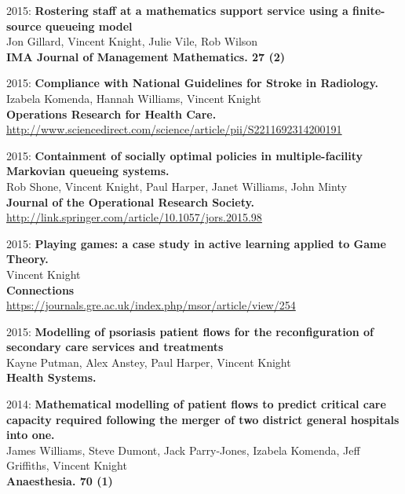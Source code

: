 \documentclass[10pt]{res} %
\begin{document}
\begin{resume}
\begin{etaremune}
\item
2015: \textbf{Rostering staff at a mathematics support service using a finite-source queueing model}\\
Jon Gillard, Vincent Knight, Julie Vile, Rob Wilson
\\
\textbf{IMA Journal of Management Mathematics. 27 (2)}
\\

\item
2015: \textbf{Compliance with National Guidelines for Stroke in Radiology.}\\
Izabela Komenda, Hannah Williams, Vincent Knight
\\
\textbf{Operations Research for Health Care.}
\\
\url{http://www.sciencedirect.com/science/article/pii/S2211692314200191}
\\

\item
2015: \textbf{Containment of socially optimal policies in multiple-facility Markovian queueing systems.}\\
Rob Shone, Vincent Knight, Paul Harper, Janet Williams, John Minty
\\
\textbf{Journal of the Operational Research Society.}
\\
\url{http://link.springer.com/article/10.1057/jors.2015.98}
\\

\item
2015: \textbf{Playing games: a case study in active learning applied to Game Theory.}\\
Vincent Knight
\\
\textbf{Connections}
\\
\url{https://journals.gre.ac.uk/index.php/msor/article/view/254}
\\

\item
2015: \textbf{Modelling of psoriasis patient flows for the reconfiguration of secondary care services and treatments}\\
Kayne Putman, Alex Anstey, Paul Harper, Vincent Knight
\\
\textbf{Health Systems.}
\\

\item
2014: \textbf{Mathematical modelling of patient flows to predict critical care capacity required following the merger of two district general hospitals into one.}\\
James Williams, Steve Dumont, Jack Parry-Jones, Izabela Komenda, Jeff Griffiths, Vincent Knight
\\
\textbf{Anaesthesia. 70 (1)}
\\


\end{etaremune}
\end{resume}
\end{document}
